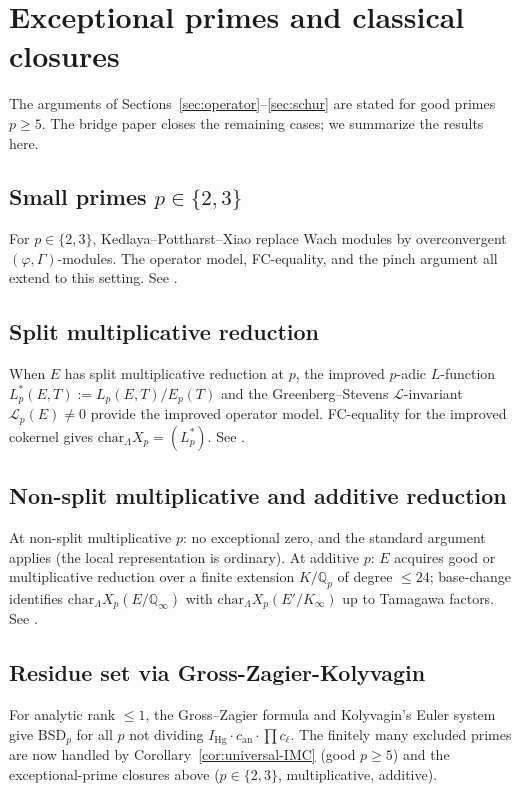 \documentclass[12pt,reqno]{amsart}
\theoremstyle{definition}
\theoremstyle{remark}
\newcommand{\Q}{\mathbb{Q}}
\newcommand{\Qp}{\mathbb{Q}_p}
\newcommand{\Qinf}{\Q_\infty}
\newcommand{\Lam}{\Lambda}
\newcommand{\chr}{\mathrm{char}}
\begin{document}
\section{Exceptional primes and classical closures}\label{sec:exceptional}

The arguments of Sections~\ref{sec:operator}--\ref{sec:schur} are stated for good primes $p\ge 5$.  The bridge paper \cite{F7} closes the remaining cases; we summarize the results here.

\subsection{Small primes $p\in\{2,3\}$}
For $p\in\{2,3\}$, Kedlaya--Pottharst--Xiao \cite{KPX} replace Wach modules by overconvergent $(\varphi,\Gamma)$-modules.  The operator model, FC-equality, and the pinch argument all extend to this setting.  See \cite[Proposition~8.5]{F7}.

\subsection{Split multiplicative reduction}
When $E$ has split multiplicative reduction at $p$, the improved $p$-adic $L$-function $L_p^*(E,T):=L_p(E,T)/E_p(T)$ and the Greenberg--Stevens $\mathcal L$-invariant $\mathcal L_p(E)\ne 0$ \cite{GS} provide the improved operator model.  FC-equality for the improved cokernel gives $\chr_\Lam X_p=(L_p^*)$.  See \cite[Proposition~8.7]{F7}.

\subsection{Non-split multiplicative and additive reduction}
At non-split multiplicative $p$: no exceptional zero, and the standard argument applies (the local representation is ordinary).  At additive $p$: $E$ acquires good or multiplicative reduction over a finite extension $K/\Qp$ of degree $\le 24$; base-change identifies $\chr_\Lam X_p(E/\Qinf)$ with $\chr_\Lam X_p(E'/K_\infty)$ up to Tamagawa factors.  See \cite[Proposition~8.9]{F7}.

\subsection{Residue set via Gross-Zagier-Kolyvagin}
For analytic rank $\le 1$, the Gross--Zagier formula \cite{GZ} and Kolyvagin's Euler system \cite{Kol} give BSD$_p$ for all $p$ not dividing $I_{\mathrm{Hg}}\cdot c_{\mathrm{an}}\cdot\prod c_\ell$.  The finitely many excluded primes are now handled by Corollary~\ref{cor:universal-IMC} (good $p\ge 5$) and the exceptional-prime closures above ($p\in\{2,3\}$, multiplicative, additive).
\end{document}
